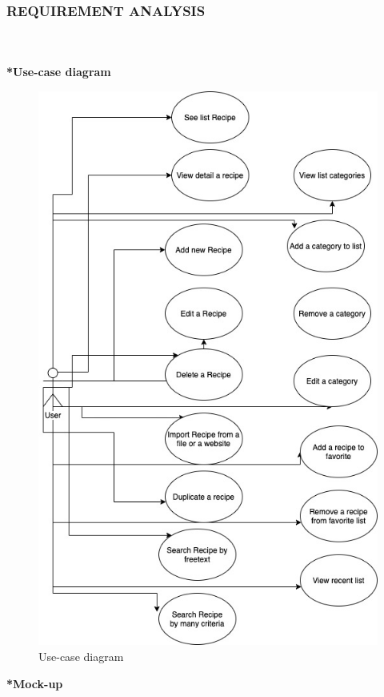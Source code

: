 \documentclass{article}
\begin{document}
\subsubsection{REQUIREMENT ANALYSIS  }\\\\
\textbf{ *Use-case diagram}\\
\begin{figure}[h!]
\centering
\includegraphics[scale=0.5]{Images/Usecase.jpg}
\caption{Use-case diagram}
\label{fig:Usecase}
\end{figure}
\newpage
\textbf{*Mock-up}
\end{document}
